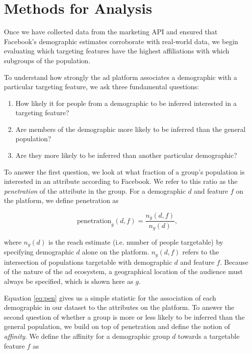 \section{Methods for Analysis} \label{sec:methods}
Once we have collected data from the marketing API and ensured that Facebook's demographic estimates corroborate with real-world data, we begin evaluating which targeting features have the highest affiliations with which subgroups of the population.

To understand how strongly the ad platform associates a demographic with a particular targeting feature, we ask three fundamental questions:

\begin{enumerate}
\item How likely it for people from a demographic to be inferred interested in a targeting feature?
\item Are members of the demographic more likely to be inferred than the general population?
\item Are they more likely to be inferred than another particular demographic?
\end{enumerate}

To answer the first question, we look at what fraction of a group's population is interested in an attribute according to Facebook. We refer to this ratio as the \textit{penetration} of the attribute in the group. For a demographic $d$ and feature $f$ on the platform, we define penetration as

\begin{equation}
\text{penetration}_g(d, f) = \frac{n_g(d, f)}{n_g(d)},
\label{eq:pen}
\end{equation}

where $n_g(d)$ is the reach estimate (i.e. number of people targetable) by specifying demographic $d$ alone on the platform. $n_g(d, f)$ refers to the intersection of populations targetable with demographic $d$ and feature $f$. Because of the nature of the ad ecosystem, a geographical location of the audience must always be specified, which is shown here as $g$.

Equation \ref{eq:pen} gives us a simple statistic for the association of each demographic in our dataset to the attributes on the platform. To answer the second question of whether a group is more or less likely to be inferred than the general population, we build on top of penetration and define the notion of \textit{affinity}. We define the affinity for a demographic group $d$ towards a targetable feature $f$ as

